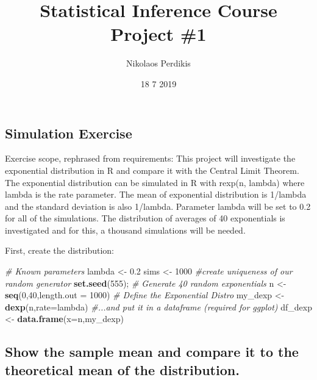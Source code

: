 \documentclass[]{article}
\title{Statistical Inference Course Project \#1}
\author{Nikolaos Perdikis}
\date{18 7 2019}
\newenvironment{Shaded}{\begin{snugshade}}{\end{snugshade}}
\newcommand{\CommentTok}[1]{\textcolor[rgb]{0.56,0.35,0.01}{\textit{#1}}}
\newcommand{\DataTypeTok}[1]{\textcolor[rgb]{0.13,0.29,0.53}{#1}}
\newcommand{\DecValTok}[1]{\textcolor[rgb]{0.00,0.00,0.81}{#1}}
\newcommand{\FloatTok}[1]{\textcolor[rgb]{0.00,0.00,0.81}{#1}}
\newcommand{\KeywordTok}[1]{\textcolor[rgb]{0.13,0.29,0.53}{\textbf{#1}}}
\newcommand{\NormalTok}[1]{#1}
\newcommand{\StringTok}[1]{\textcolor[rgb]{0.31,0.60,0.02}{#1}}
\begin{document}
\maketitle

\hypertarget{simulation-exercise}{%
\subsection{Simulation Exercise}\label{simulation-exercise}}

Exercise scope, rephrased from requirements: This project will
investigate the exponential distribution in R and compare it with the
Central Limit Theorem. The exponential distribution can be simulated in
R with rexp(n, lambda) where lambda is the rate parameter. The mean of
exponential distribution is 1/lambda and the standard deviation is also
1/lambda. Parameter lambda will be set to 0.2 for all of the
simulations. The distribution of averages of 40 exponentials is
investigated and for this, a thousand simulations will be needed.

First, create the distribution:

\begin{Shaded}
\begin{Highlighting}[]
\CommentTok{# Known parameters}
\NormalTok{lambda <-}\StringTok{ }\FloatTok{0.2}
\NormalTok{sims <-}\StringTok{ }\DecValTok{1000}
\CommentTok{#create uniqueness of our random generator}
\KeywordTok{set.seed}\NormalTok{(}\DecValTok{555}\NormalTok{);}
\CommentTok{# Generate 40 random exponentials}
\NormalTok{n <-}\StringTok{ }\KeywordTok{seq}\NormalTok{(}\DecValTok{0}\NormalTok{,}\DecValTok{40}\NormalTok{,}\DataTypeTok{length.out =} \DecValTok{1000}\NormalTok{)}
\CommentTok{# Define the Exponential Distro}
\NormalTok{my_dexp <-}\StringTok{ }\KeywordTok{dexp}\NormalTok{(n,}\DataTypeTok{rate=}\NormalTok{lambda)}
\CommentTok{#...and put it in a dataframe (required for ggplot)}
\NormalTok{df_dexp <-}\StringTok{ }\KeywordTok{data.frame}\NormalTok{(}\DataTypeTok{x=}\NormalTok{n,my_dexp)}
\end{Highlighting}
\end{Shaded}

\hypertarget{show-the-sample-mean-and-compare-it-to-the-theoretical-mean-of-the-distribution.}{%
\subsection{Show the sample mean and compare it to the theoretical mean
of the
distribution.}\label{show-the-sample-mean-and-compare-it-to-the-theoretical-mean-of-the-distribution.}}
\end{document}
